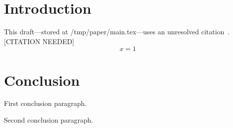 \documentclass{article}
\begin{document}
\section{Introduction}
This draft—stored at /tmp/paper/main.tex—uses an unresolved citation~\cite{missing2026}. [CITATION NEEDED]
\[
x = 1
\]
\section{Conclusion}
First conclusion paragraph.

Second conclusion paragraph.
\end{document}
